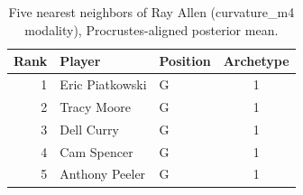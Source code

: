 \begin{table}[htbp]
  \centering\small
  \begin{tabular}{rllc}
    \toprule
    Rank & Player & Position & Archetype \\
    \midrule
    1 & Eric Piatkowski & G & 1 \\
    2 & Tracy Moore & G & 1 \\
    3 & Dell Curry & G & 1 \\
    4 & Cam Spencer & G & 1 \\
    5 & Anthony Peeler & G & 1 \\
    \bottomrule
  \end{tabular}
  \caption{Five nearest neighbors of Ray Allen (curvature_m4 modality), Procrustes-aligned posterior mean.}
  \label{tab:Ray_Allen_neighbors_curvature_m4}
\end{table}

